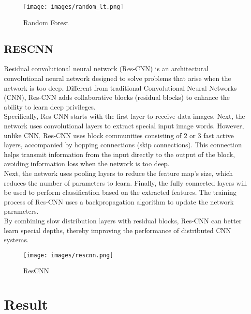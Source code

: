 \documentclass{ieeeojies}
\begin{document}
\begin{figure}[H]
  \centering
  \begin{minipage}{0.8\linewidth}
    \centering
    \texttt{[image: images/random\_lt.png]}
    \caption{Random Forest}
    \label{fig8}
  \end{minipage}
\end{figure}

\subsection{RESCNN}
\indent Residual convolutional neural network (Res-CNN) is an architectural convolutional neural network designed to solve problems that arise when the network is too deep. Different from traditional Convolutional Neural Networks (CNN), Res-CNN adds collaborative blocks (residual blocks) to enhance the ability to learn deep privileges.
\\
\indent Specifically, Res-CNN starts with the first layer to receive data images. Next, the network uses convolutional layers to extract special input image words. However, unlike CNN, Res-CNN uses block communities consisting of 2 or 3 fast active layers, accompanied by hopping connections (skip connections). This connection helps transmit information from the input directly to the output of the block, avoiding information loss when the network is too deep.
\\
\indent Next, the network uses pooling layers to reduce the feature map's size, which reduces the number of parameters to learn. Finally, the fully connected layers will be used to perform classification based on the extracted features. The training process of Res-CNN uses a backpropagation algorithm to update the network parameters.
\\
\indent By combining slow distribution layers with residual blocks, Res-CNN can better learn special depths, thereby improving the performance of distributed CNN systems.

\begin{figure}[H]
  \centering
  \begin{minipage}{0.8\linewidth}
    \centering
    \texttt{[image: images/rescnn.png]}
    \caption{ResCNN}
    \label{fig8}
  \end{minipage}
\end{figure}

\section{Result}
\end{document}

